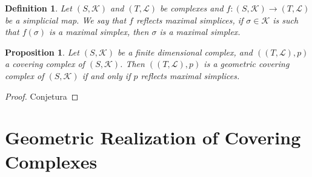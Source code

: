 \documentclass{amsart}
\newtheorem{proposition}{Proposition}[section]
\newtheorem{definition}{Definition}[section]
\begin{document}
\begin{definition}
Let  $(S,\mathcal{K})$ and $(T,\mathcal{L})$ be complexes and $f\colon (S,\mathcal{K})\longrightarrow (T,\mathcal{L})$ be a simplicial map. We say that $f$ reflects maximal simplices, if $\sigma\in\mathcal{K}$ is such that $f(\sigma)$ is a maximal simplex, then $\sigma$ is a maximal simplex.
\end{definition}


\begin{proposition}
Let $(S,\mathcal{K})$ be a finite dimensional complex, and $((T,\mathcal{L}),p)$ a covering complex of $(S,\mathcal{K})$. Then $((T,\mathcal{L}),p)$ is a geometric covering complex of $(S,\mathcal{K})$ if and only if $p$ reflects maximal simplices.
\end{proposition}

\begin{proof}
Conjetura
\end{proof}




\section{Geometric Realization of Covering Complexes}
\end{document}
